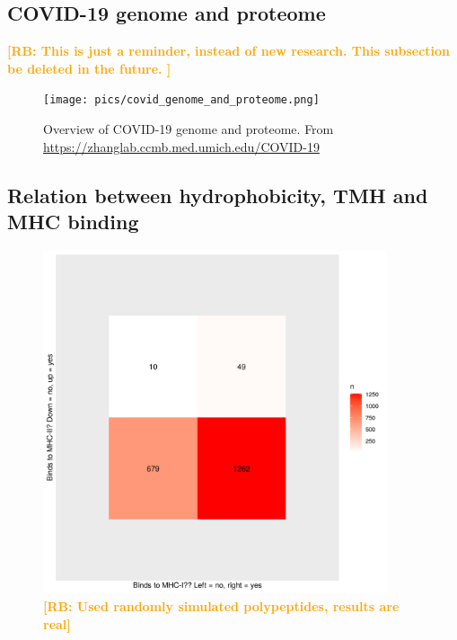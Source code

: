 \documentclass{article}
\newcommand{\richel}[1]{\textcolor{orange}{\textbf{[RB: #1]}}}
\begin{document}
\subsection{COVID-19 genome and proteome}

\richel{
  This is just a reminder, instead of new research. 
  This subsection be deleted in the future.
}

\begin{figure}[!htbp]
  \texttt{[image: pics/covid\_genome\_and\_proteome.png]}
  \caption{
    Overview of COVID-19 genome and proteome.
    From 
    \url{https://zhanglab.ccmb.med.umich.edu/COVID-19}
  }
  \label{fig:covid_genome_and_proteome}
\end{figure}

\subsection{Relation between hydrophobicity, TMH and MHC binding}

\begin{figure}[!htbp]
  \includegraphics[width=0.9\textwidth]{p_bind_per_hydrophobicity/binds_mhc1_vs_binds_mhc2.png}
  \caption{
    \richel{Used randomly simulated polypeptides, results are real}
  }
  \label{fig:binds_mhc1_vs_binds_mhc2}
\end{figure}
\end{document}
